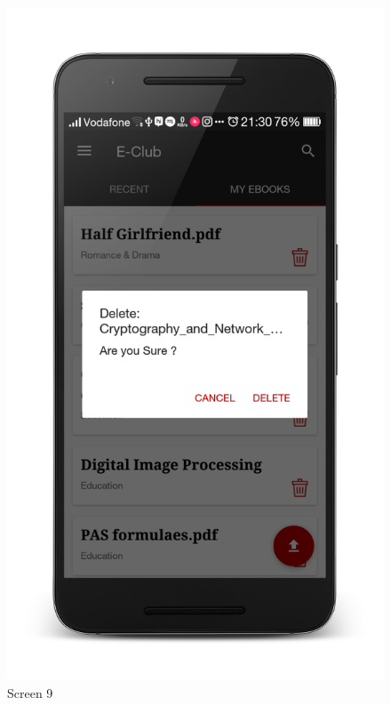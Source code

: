 \begin{figure}[ht]
\centering
\includegraphics[scale=0.13]{images/d1.png}
\caption{Screen 9}
\end{figure}

\newpage

